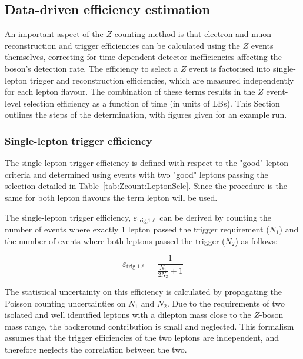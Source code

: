 \subsection{Data-driven efficiency estimation}
\label{sec:Zcount:Data driven effs}

An important aspect of the $Z$-counting method is that electron and muon reconstruction and trigger efficiencies can be calculated using the $Z$ events themselves, correcting for time-dependent detector inefficiencies affecting the boson's detection rate. The efficiency to select a $Z$ event is factorised into single-lepton trigger and reconstruction efficiencies, which are measured independently for each lepton flavour. The combination of these terms results in the $Z$ event-level selection efficiency as a function of time (in units of LBs). This Section outlines the steps of the determination, with figures given for an example run.

\subsubsection{Single-lepton trigger efficiency}

The single-lepton trigger efficiency is defined with respect to the "good" lepton criteria and determined using events with two "good" leptons passing the selection detailed in Table~\ref{tab:Zcount:LeptonSele}. Since the procedure is the same for both lepton flavours the term lepton will be used.

The single-lepton trigger efficiency, $\varepsilon_{\text{trig,}1\ell}$ can be derived by counting the number of events where exactly 1 lepton passed the trigger requirement ($N_1$) and the number of events where both leptons passed the trigger ($N_2$) as follows:

\begin{equation}
	\varepsilon_{\text{trig,}1\ell}=\frac{1}{\frac{N_1}{2N_2}+1}
		\label{eq:Zcount:Single-lep trig eff}
\end{equation}

The statistical uncertainty on this efficiency is calculated by propagating the Poisson counting uncertainties on $N_1$ and $N_2$. Due to the requirements of two isolated and well identified leptons with a dilepton mass close to the $Z$-boson mass range, the background contribution is small and neglected. This formalism assumes that the trigger efficiencies of the two leptons are independent, and therefore neglects the correlation between the two.

